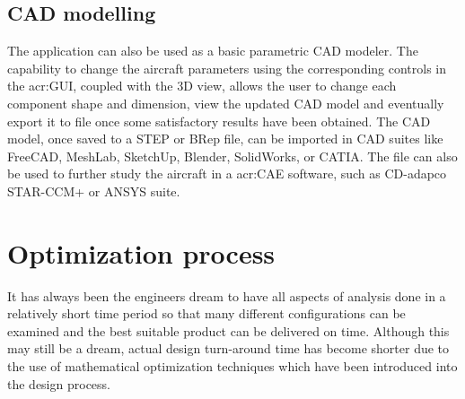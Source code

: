 \subsection{CAD modelling}
The application can also be used as a basic parametric CAD modeler. The capability to change the aircraft parameters using the corresponding controls in the \gls{acr:GUI}, coupled with the 3D view, allows the user to change each component shape and dimension, view the updated CAD model and eventually export it to file once some satisfactory results have been obtained.
%
The CAD model, once saved to a STEP or BRep file, can be imported in CAD suites like FreeCAD, MeshLab, SketchUp, Blender, SolidWorks, or CATIA. The file can also be used to further study the aircraft in a \gls{acr:CAE} software, such as CD-adapco STAR-CCM+ or ANSYS suite.
%
\section{Optimization process}
\label{par:Optimization}
It has always been the engineers dream to have all aspects of analysis done in a relatively short time period so that many different configurations can be examined and the best suitable product can be delivered on time. Although this may still be a dream, actual design turn-around time has become shorter due to the use of mathematical optimization techniques which have been introduced into the design process.\cite{torenbeek2013advanced}

